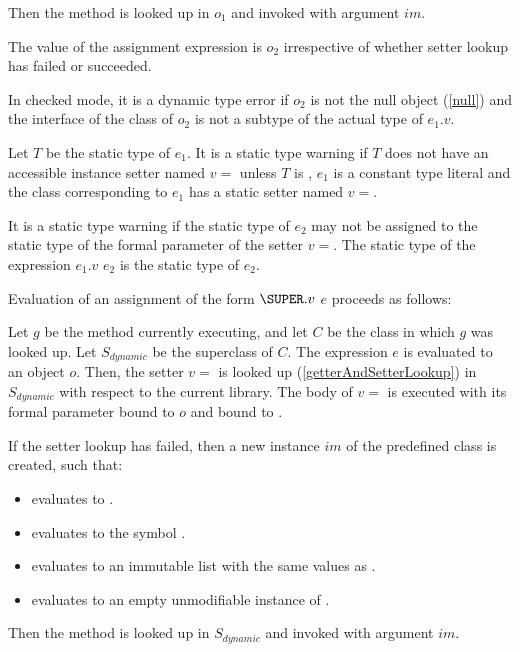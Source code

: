 \documentclass{article}
\begin{document}
\LMHash{}
Then the method  is looked up in $o_1$ and invoked with argument $im$.

\LMHash{}
The value of the assignment expression is $o_2$ irrespective of whether setter lookup has failed or succeeded.

\LMHash{}
In checked mode, it is a dynamic type error if $o_2$ is not the null object (\ref{null}) and the interface of the class of $o_2$ is not a subtype of the actual type of $e_1.v$.

\LMHash{}
Let $T$ be the static type of $e_1$.
It is a static type warning if $T$ does not have an accessible instance setter named $v=$ unless $T$ is , $e_1$ is a constant type literal and the class corresponding to $e_1$ has a static setter named $v=$.

\LMHash{}
It is a static type warning if the static type of $e_2$ may not be assigned to the static type of the formal parameter of the setter $v=$.
The static type of the expression $e_1.v$ \code{=} $e_2$ is the static type of $e_2$.

\LMHash{}
Evaluation of an assignment of the form $\SUPER.v$ \code{=} $e$ proceeds as follows:

\LMHash{}
Let $g$ be the method currently executing, and let $C$ be the class in which $g$ was looked up.
Let $S_{dynamic}$ be the superclass of $C$.
The expression $e$ is evaluated to an object $o$.
Then, the setter $v=$ is looked up (\ref{getterAndSetterLookup}) in $S_{dynamic}$ with respect to the current library.
The body of $v=$ is executed with its formal parameter bound to $o$ and \THIS{} bound to \THIS{}.

\LMHash{}
If the setter lookup has failed, then a new instance $im$ of the predefined class  is created, such that:
\begin{itemize}
\item {} evaluates to \code{\TRUE{}}.
\item {} evaluates to the symbol .
\item {} evaluates to an immutable list with the same values as \code{[$o$]}.
\item {} evaluates to an empty unmodifiable instance of .
\end{itemize}

\LMHash{}
Then the method  is looked up in $S_{dynamic}$ and invoked with argument $im$.
\end{document}
